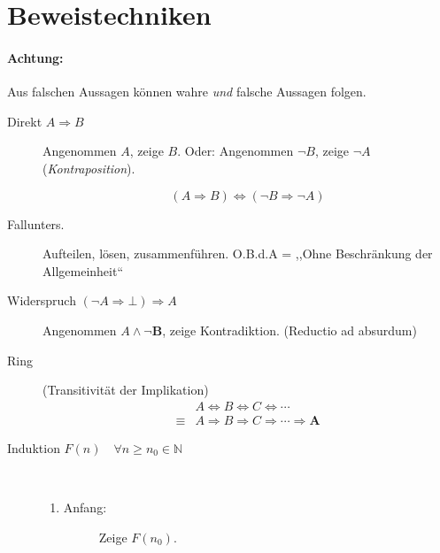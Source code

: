 \section[Beweistechniken]{Beweistechniken\hfill\emph{\qedsymbol}}

\paragraph{Achtung:} Aus falschen Aussagen können wahre \emph{und} falsche Aussagen folgen.

\begin{description}
  \item[Direkt $A \Rightarrow B$]
    Angenommen $A$, zeige $B$.
    Oder: Angenommen $\neg B$, zeige $\neg A$ \linebreak (\emph{Kontraposition}).

    $$
      (A \Rightarrow B) \Leftrightarrow (\neg B \Rightarrow \neg A)
    $$

  \item[Fallunters.]
    Aufteilen, lösen, zusammenführen.
    O.B.d.A = ,,Ohne Beschränkung der Allgemeinheit``

  \item[Widerspruch $(\neg A  \Rightarrow \bot) \Rightarrow A$]
    Angenommen $A \land \mathbf{\neg B}$, zeige Kontradiktion. (Reductio ad absurdum)

  \item[Ring] (Transitivität der Implikation)
    \begin{align*}
             & A \Leftrightarrow B \Leftrightarrow C \Leftrightarrow \cdots            \\
      \equiv & A \Rightarrow B \Rightarrow C \Rightarrow \cdots \mathbf{\Rightarrow A}
    \end{align*}

  \item[Induktion $F(n) \quad \forall n \geq n_0 \in \mathbb{N}$]
    \

    \begin{enumerate}
      \item
            \begin{description}
              \item[Anfang:]
                Zeige $F(n_0)$.
            \end{description}


\end{enumerate}
\end{description}

